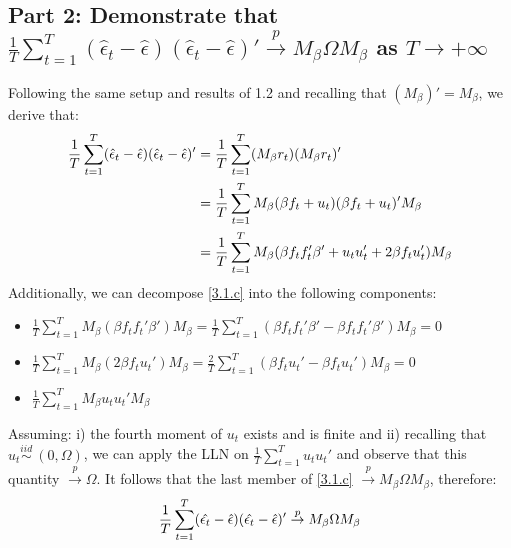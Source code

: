 \documentclass[12pt]{article}
\begin{document}
\subsection{Part 2: Demonstrate that $\frac{1}{T}\sum_{t=1}^{T}(\hat{\epsilon}_t-\hat{\epsilon})(\hat{\epsilon}_t-\hat{\epsilon})' \overset{p}{\to} M_\beta\Omega M_\beta$ as $T\to{+\infty}$} 
Following the same setup and results of 1.2 and recalling that $(M_\beta)' = M_\beta$, we derive that:
\begin{align} \label{3.1.c}
\frac{1}{T}\sum_{t=1}^{T}(\hat{\epsilon}_t-\hat{\epsilon})(\hat{\epsilon}_t-\hat{\epsilon})' &= \frac{1}{T}\sum_{t=1}^{T}(M_\beta r_t)(M_\beta r_t)' \notag\\
&= \frac{1}{T}\sum_{t=1}^{T} M_\beta(\beta f_t + u_t)(\beta f_t + u_t)'M_\beta \notag\\
&= \frac{1}{T}\sum_{t=1}^{T}M_\beta (\beta f_t f_t' \beta' + u_t u_t' + 2\beta f_t u_t') M_\beta  
\end{align} 
Additionally, we can decompose \ref{3.1.c} into the following components:
 \begin{itemize}
 \item $\frac{1}{T}\sum_{t=1}^{T}M_\beta(\beta f_t f_t' \beta') M_\beta = \frac{1}{T}\sum_{t=1}^{T}(\beta f_t f_t' \beta' - \beta f_t f_t' \beta')M_\beta = 0$ 
 \item $\frac{1}{T}\sum_{t=1}^{T}M_\beta(2\beta f_t u_t')M_\beta = \frac{2}{T}\sum_{t=1}^{T}(\beta f_t u_t'-\beta f_t u_t')M_\beta = 0$
 \item $\frac{1}{T}\sum_{t=1}^{T}M_\beta u_t u_t' M_\beta$
 \end{itemize}
 Assuming: i) the fourth moment of $u_t$ exists and is finite and ii) recalling that $u_t \overset{iid}{\sim} \: (0,\Omega)$, we can apply the LLN on $\frac{1}{T}\sum_{t=1}^{T} u_t u_t'$ and observe that this quantity $\overset{p}{\to} \Omega$.
 It follows that the last member of \ref{3.1.c} $\overset{p}{\to} M_\beta \Omega M_\beta$, therefore:
\begin{align} \label{3.2.b}
\frac{1}{T}\sum_{t=1}^{T}(\hat{\epsilon_t}-\hat{\epsilon})(\hat{\epsilon_t}-\hat{\epsilon})' \overset{p}{\to} M_\beta \Omega M_\beta \\ \notag 
\end{align}    
\end{document}
